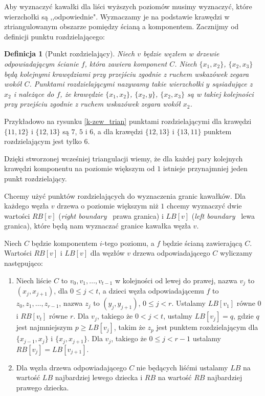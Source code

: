 \documentclass[twoside,a4paper,12pt]{report} %
\theoremstyle{break}
\newtheorem{definition}{Definicja}[section]
\begin{document}
Aby wyznaczyć kawałki dla liści wyższych poziomów musimy wyznaczyć, które wierzchołki są ,,odpowiednie". Wyznaczamy je na podstawie krawędzi w ztriangulowanym obszarze pomiędzy ścianą a komponentem. Zacznijmy od definicji punktu rozdzielającego:

\begin{definition}[Punkt rozdzielający]
Niech $v$ będzie węzłem w drzewie odpowiadającym ścianie $f$, która zawiera komponent $C$. Niech $\{x_1, x_2\}$, $\{x_2, x_3\}$ będą kolejnymi krawędziami przy przejściu zgodnie z ruchem wskazówek zegara wokół $C$. Punktami rozdzielającymi nazywamy takie wierzchołki $y$ sąsiadujące z $x_2$ i należące do $f$, że krawędzie $\{x_1, x_2\}$, $\{x_2, y\}$, $\{x_2, x_3\}$ są w takiej kolejności przy przejściu zgodnie z ruchem wskazówek zegara wokół $x_2$.
\end{definition}

Przykładowo na rysunku \ref{k-zew_trian} punktami rozdzielającymi dla krawędzi $\{11,12\}$ i $\{12,13\}$ są $7$, $5$ i $6$, a dla krawędzi $\{12,13\}$ i $\{13,11\}$ punktem rozdzielającym jest tylko $6$.

Dzięki stworzonej wcześniej triangulacji wiemy, że dla każdej pary kolejnych krawędzi komponentu na poziomie większym od $1$ istnieje przynajmniej jeden punkt rozdzielający.

Chcemy użyć punktów rozdzielających do wyznaczenia granic kawałków. Dla każdego węzła $v$ drzewa o poziomie większym niż $1$ chcemy wyznaczyć dwie wartości $RB[v]$ (\emph{right boundary} \textendash\ prawa granica) i $LB[v]$ (\emph{left boundary} \textendash\ lewa granica), które będą nam wyznaczać granice kawałka węzła $v$.

Niech $C$ będzie komponentem $i$-tego poziomu, a $f$ będzie ścianą zawierającą $C$. Wartości $RB[v]$ i $LB[v]$ dla węzłów $v$ drzewa odpowiadającego $C$ wyliczamy następująco:
\begin{enumerate}
    \item Niech liście $C$ to $v_0, v_1, \dots, v_{t-1}$ w kolejności od lewej do prawej, nazwa $v_j$ to $(x_j, x_{j+1})$, dla $0 \leq j < t$, a dzieci węzła odpowiadającemu $f$ to $z_0, z_1, \dots, z_{r-1}$, nazwa $z_j$ to $(y_j, y_{j+1})$, $0 \le j < r$. Ustalamy $LB[v_1]$ równe $0$ i $RB[v_t]$ równe $r$. Dla $v_j$, takiego że $0 < j < t$, ustalmy $LB[v_j] = q$, gdzie $q$ jest najmniejszym $p \ge LB[v_j]$, takim że $z_p$ jest punktem rozdzielającym dla $\{x_{j-1}, x_j\}$ i $\{x_j, x_{j+1}\}$. Dla $v_j$, takiego że $0 \le j < r-1$ ustalamy $RB[v_j]=LB[v_{j+1}]$.
    \item Dla węzła drzewa odpowiadającego $C$ nie będących liśćmi ustalamy $LB$ na wartość $LB$ najbardziej lewego dziecka i $RB$ na wartość $RB$ najbardziej prawego dziecka.
\end{enumerate}\par
\end{document}
